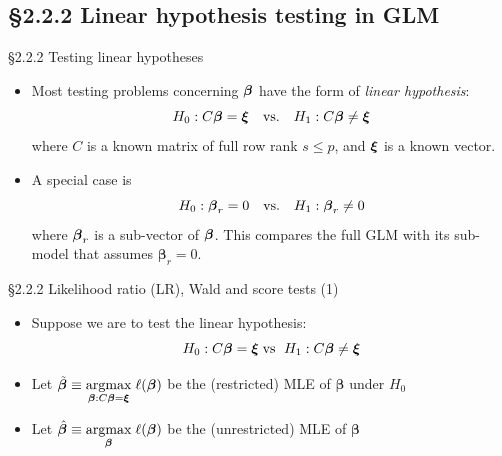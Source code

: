 \documentclass{beamer}
\newcommand{\currentsubsection}{}
\let\oldsubsection\subsection
\renewcommand{\subsection}[1]{\oldsubsection{#1}\renewcommand{\currentsubsection}{#1}}
\newcommand{\boldbeta}{{\boldsymbol \beta}}
\newenvironment{wideitemize}%
  {\begin{itemize}%
    \setlength{\parskip}{1em}}%
  {\end{itemize}}
\begin{document}
\subsection{\S2.2.2 Linear hypothesis testing in GLM}

\begin{frame}{\S2.2.2 Testing linear hypotheses}
\begin{itemize}
\item
Most testing problems concerning $\mbox{\boldmath $\beta$}$ have the form of \textit{linear hypothesis}:
$$H_0: C\mbox{\boldmath $\beta$}=\mbox{\boldmath $\xi$} \quad\mbox{vs.}\quad
H_1: C\mbox{\boldmath $\beta$}\neq\mbox{\boldmath $\xi$}$$
where $C$ is a known matrix of full row rank $s\leq p$, and $\mbox{\boldmath $\xi$}$ is a known vector.
\item
A special case is 
$$H_0: \mbox{\boldmath $\beta$}_r=0 \quad\mbox{vs.}\quad
H_1: \mbox{\boldmath $\beta$}_r\neq 0$$
where $\mbox{\boldmath $\beta$}_r$ is a sub-vector of $\mbox{\boldmath $\beta$}$. This compares the full GLM  with its sub-model that assumes $\boldbeta_r = 0$.
\end{itemize}
\end{frame}


\begin{frame}{\S2.2.2 Likelihood ratio (LR), Wald and score tests (1)}
\begin{wideitemize}
\item
Suppose we are to test the linear hypothesis:
\[
H_0: C\mbox{\boldmath $\beta$}=\mbox{\boldmath $\xi$}
\;\mbox{vs }\; H_1: C\mbox{\boldmath $\beta$}\neq\mbox{\boldmath $\xi$}
\]

\item Let $\tilde{\boldbeta} \equiv \underset{\boldbeta: C \boldbeta = {\boldsymbol \xi}}{\text{argmax}} \hspace{1mm}\ell(\boldbeta)$ be the (restricted) MLE of
$\boldbeta$  under $H_0$

\item Let  $\hat{\boldbeta} \equiv \underset{\boldbeta}{\text{argmax}} \hspace{1mm} \ell(\boldbeta)$ be the (unrestricted) MLE of
$\boldbeta$ 


\end{wideitemize}
\end{frame}
\end{document}
